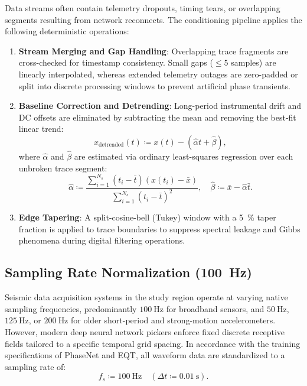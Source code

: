 Data streams often contain telemetry dropouts, timing tears, or
overlapping segments resulting from network reconnects. The
conditioning pipeline applies the following deterministic operations:
\begin{enumerate}
  \item \textbf{Stream Merging and Gap Handling}: Overlapping trace
    fragments are cross-checked for timestamp consistency. Small
    gaps ($\le 5$ samples) are linearly interpolated, whereas
    extended telemetry outages are zero-padded or split into
    discrete processing windows to prevent artificial phase transients.
  \item \textbf{Baseline Correction and Detrending}: Long-period
    instrumental drift and DC offsets are eliminated by subtracting
    the mean and removing the best-fit linear trend:
    \begin{equation}
      x_{\mathrm{detrended}}(t) \coloneqq x(t) - (\hat{\alpha} t +
      \hat{\beta}),
    \end{equation}
    where $\hat{\alpha}$ and $\hat{\beta}$ are estimated via
    ordinary least-squares regression over each unbroken trace segment:
    \begin{equation}
      \hat{\alpha} \coloneqq \frac{\sum_{i = 1}^{N_s} (t_i - \bar{t})(x(t_i) -
      \bar{x})}{\sum_{i = 1}^{N_s} (t_i - \bar{t})^2}, \quad
      \hat{\beta} \coloneqq \bar{x} - \hat{\alpha}\bar{t}.
    \end{equation}
  \item \textbf{Edge Tapering}: A split-cosine-bell (Tukey) window
    with a \qty{5}{\percent} taper fraction is applied to trace boundaries to
    suppress spectral leakage and Gibbs phenomena during digital
    filtering operations.
\end{enumerate}

\subsection{Sampling Rate Normalization (\qty{100}{\hertz})}
\label{subsec:sampling_rate}
Seismic data acquisition systems in the study region operate at
varying native sampling frequencies, predominantly
$\qty{100}{\hertz}$ for broadband sensors, and $\qty{50}{\hertz}$,
$\qty{125}{\hertz}$, or $\qty{200}{\hertz}$ for older short-period and
strong-motion accelerometers. However, modern deep neural network
pickers enforce fixed discrete receptive fields tailored to a
specific temporal grid spacing. In accordance with the training
specifications of \ac{PhaseNet} and \ac{EQT}, all waveform data are
standardized to a
sampling rate of:
\begin{equation}
  f_s \coloneqq \qty{100}{\hertz} \quad (\Delta t \coloneqq
  \qty{0.01}{\second}).
\end{equation}

